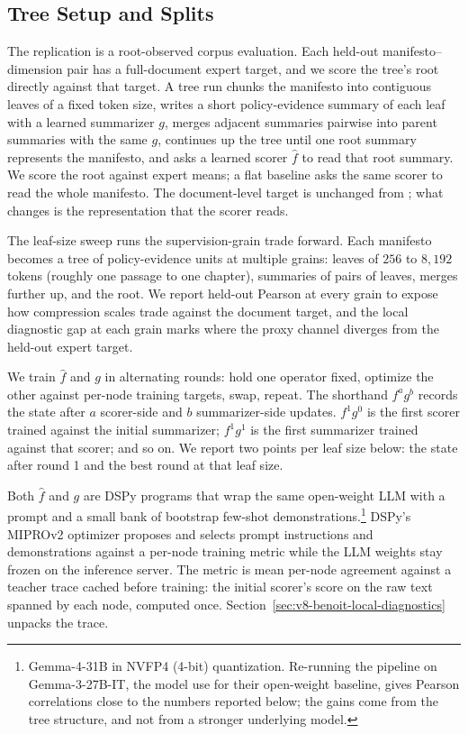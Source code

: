 \subsection{Tree Setup and Splits}\label{sec:v8-benoit-tree-setup}

The replication is a root-observed corpus evaluation. Each held-out
manifesto--dimension pair has a full-document expert target, and we
score the tree's root directly against that target. A tree run
chunks the manifesto into contiguous leaves of a fixed token size,
writes a short policy-evidence summary of each leaf with a learned
summarizer \(g\), merges adjacent summaries pairwise into parent
summaries with the same \(g\), continues up the tree until one root
summary represents the manifesto, and asks a learned scorer
\(\widehat f\) to read that root summary. We score the root against
expert means; a flat baseline asks the same scorer to read the
whole manifesto. The document-level target is unchanged from
\citet{BenoitEtAl2025}; what changes is the representation that the
scorer reads.

The leaf-size sweep runs the supervision-grain trade forward. Each
manifesto becomes a tree of policy-evidence units at multiple
grains: leaves of \(256\) to \(8{,}192\) tokens (roughly one
passage to one chapter), summaries of pairs of leaves, merges
further up, and the root. We report held-out Pearson at every
grain to expose how compression scales trade against the document
target, and the local diagnostic gap at each grain marks where the
proxy channel diverges from the held-out expert target.

We train \(\widehat f\) and \(g\) in alternating rounds: hold one
operator fixed, optimize the other against per-node training
targets, swap, repeat. The shorthand \(f^a g^b\) records the state
after \(a\) scorer-side and \(b\) summarizer-side updates. \(f^1
g^0\) is the first scorer trained against the initial summarizer;
\(f^1 g^1\) is the first summarizer trained against that scorer;
and so on. We report two points per leaf size below: the state
after round 1 and the best round at that leaf size.

Both \(\widehat f\) and \(g\) are DSPy programs that wrap the same
open-weight LLM with a prompt and a small bank of bootstrap
few-shot demonstrations.\footnote{Gemma-4-31B in NVFP4 (4-bit)
quantization. Re-running the pipeline on Gemma-3-27B-IT, the model
\citet{BenoitEtAl2025} use for their open-weight baseline, gives
Pearson correlations close to the numbers reported below; the gains
come from the tree structure, and not from a stronger underlying
model.} DSPy's MIPROv2 optimizer proposes and selects prompt
instructions and demonstrations against a per-node training metric
while the LLM weights stay frozen on the inference server. The
metric is mean per-node agreement against a teacher trace cached
before training: the initial scorer's score on the raw text spanned
by each node, computed once.
Section~\ref{sec:v8-benoit-local-diagnostics} unpacks the trace.

